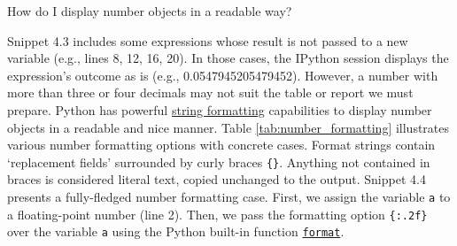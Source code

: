 \documentclass[a4paper,11pt]{book}
\newcommand{\question}[1]{%
    \begin{tcolorbox}[colback=comp_c!10,colframe=comp_c,sidebyside align=top,width=\linewidth,before skip=1ex]
        #1
    \end{tcolorbox}
    \switchcolumn%
}
\newcommand{\note}[1]{%
    \begin{tcolorbox}[colback=white!0,colframe=white!10,width=\linewidth,before skip=1ex]
        #1
    \end{tcolorbox}
}
\begin{document}
\begin{paracol}{2}
	\question{\raggedright How do I display number objects in a readable way?}
	\note{Snippet 4.3 includes some expressions whose result is not passed to a new variable (e.g., lines 8, 12, 16, 20). In those cases, the IPython session displays the expression's outcome as is (e.g., 0.0547945205479452). However, a number with more than three or four decimals may not suit the table or report we must prepare. Python has powerful \href{https://docs.python.org/3/library/string.html}{string formatting} capabilities to display number objects in a readable and nice manner. Table \ref{tab:number_formatting} illustrates various number formatting options with concrete cases. Format strings contain `replacement fields' surrounded by curly braces \texttt{\{\}}. Anything not contained in braces is considered literal text, copied unchanged to the output. Snippet 4.4 presents a fully-fledged number formatting case. First, we assign the variable \texttt{a} to a floating-point number (line 2). Then, we pass the formatting option \texttt{\{:.2f\}} over the variable \texttt{a} using the Python built-in function \href{https://docs.python.org/3/library/stdtypes.html\#str.format}{\texttt{format}}.}
\end{paracol}
\end{document}
